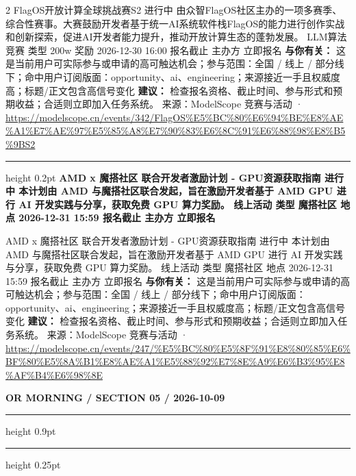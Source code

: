 \documentclass[10.5pt]{ctexart}
\begin{document}
\begin{multicols}{2}
FlagOS开放计算全球挑战赛S2 进行中 由众智FlagOS社区主办的一项多赛季、综合性赛事。大赛鼓励开发者基于统一AI系统软件栈FlagOS的能力进行创作实战和创新探索，促进AI开发者能力提升，推动开放计算生态的蓬勃发展。 LLM算法竞赛 类型 200w 奖励 2026-12-30 16:00 报名截止 主办方 立即报名
\textbf{与你有关：} 这是当前用户可实际参与或申请的高可触达机会；参与范围：全国 / 线上 / 部分线下；命中用户订阅版面：opportunity、ai、engineering；来源接近一手且权威度高；标题/正文包含高信号变化
\textbf{建议：} 检查报名资格、截止时间、参与形式和预期收益；合适则立即加入任务系统。
{\footnotesize\color{ormuted} 来源：ModelScope 竞赛与活动 · \url{https://modelscope.cn/events/342/FlagOS%E5%BC%80%E6%94%BE%E8%AE%A1%E7%AE%97%E5%85%A8%E7%90%83%E6%8C%91%E6%88%98%E8%B5%9BS2}}
\vspace{2mm}
\hrule height 0.2pt
\vspace{2mm}
{\large\bfseries AMD x 魔搭社区 联合开发者激励计划 - GPU资源获取指南 进行中 本计划由 AMD 与魔搭社区联合发起，旨在激励开发者基于 AMD GPU 进行 AI 开发实践与分享，获取免费 GPU 算力奖励。 线上活动 类型 魔搭社区 地点 2026-12-31 15:59 报名截止 主办方 立即报名}\par
AMD x 魔搭社区 联合开发者激励计划 - GPU资源获取指南 进行中 本计划由 AMD 与魔搭社区联合发起，旨在激励开发者基于 AMD GPU 进行 AI 开发实践与分享，获取免费 GPU 算力奖励。 线上活动 类型 魔搭社区 地点 2026-12-31 15:59 报名截止 主办方 立即报名
\textbf{与你有关：} 这是当前用户可实际参与或申请的高可触达机会；参与范围：全国 / 线上 / 部分线下；命中用户订阅版面：opportunity、ai、engineering；来源接近一手且权威度高；标题/正文包含高信号变化
\textbf{建议：} 检查报名资格、截止时间、参与形式和预期收益；合适则立即加入任务系统。
{\footnotesize\color{ormuted} 来源：ModelScope 竞赛与活动 · \url{https://modelscope.cn/events/247/%E5%BC%80%E5%8F%91%E8%80%85%E6%BF%80%E5%8A%B1%E8%AE%A1%E5%88%92%E7%8E%A9%E6%B3%95%E8%AF%B4%E6%98%8E}}
\end{multicols}
\newpage
{\small\bfseries OR MORNING / SECTION 05 / 2026-10-09}
\vspace{2mm}
\hrule height 0.9pt
\vspace{1.5mm}
\hrule height 0.25pt
\vspace{4mm}
\end{document}
